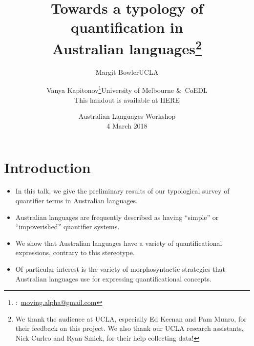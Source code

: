 \documentclass{article}
\title{Towards a typology of quantification in\\ Australian languages\thanks{We thank the audience at UCLA, especially Ed Keenan and Pam Munro, for their feedback on this project. We also thank our UCLA research assistants, Nick Curleo and Ryan Smick, for their help collecting data!}}
\author{Margit Bowler\authorcr UCLA \and \vspace{-.5cm}Vanya Kapitonov\thanks{\Letter:~\href{mailto:moving.alpha@gmail.com}{moving.alpha@gmail.com}}\authorcr University of Melbourne \&\ CoEDL\\ This handout is available at HERE} %
\date{Australian Languages Workshop\\4 March 2018}
\begin{document}
\maketitle


\section[Introduction]{Introduction}
\begin{itemize}
    \item In this talk, we give the preliminary results of our typological survey of quantifier terms in Australian languages.
    \item Australian languages are  frequently described as having ``simple'' or ``impoverished'' quantifier systems. %
    \item We show that Australian languages have a variety of quantificational expressions, contrary to this stereotype.
    \item Of particular interest is the variety of morphosyntactic strategies that Australian languages use for expressing quantificational concepts.
\end{itemize}
\end{document}
